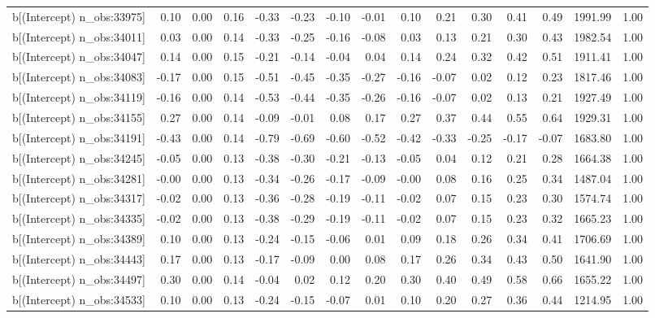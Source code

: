 \begin{table}[ht]
\begin{tabular}{rrrrrrrrrrrrrrr}
  b[(Intercept) n\_obs:33975] & 0.10 & 0.00 & 0.16 & -0.33 & -0.23 & -0.10 & -0.01 & 0.10 & 0.21 & 0.30 & 0.41 & 0.49 & 1991.99 & 1.00 \\ 
  b[(Intercept) n\_obs:34011] & 0.03 & 0.00 & 0.14 & -0.33 & -0.25 & -0.16 & -0.08 & 0.03 & 0.13 & 0.21 & 0.30 & 0.43 & 1982.54 & 1.00 \\ 
  b[(Intercept) n\_obs:34047] & 0.14 & 0.00 & 0.15 & -0.21 & -0.14 & -0.04 & 0.04 & 0.14 & 0.24 & 0.32 & 0.42 & 0.51 & 1911.41 & 1.00 \\ 
  b[(Intercept) n\_obs:34083] & -0.17 & 0.00 & 0.15 & -0.51 & -0.45 & -0.35 & -0.27 & -0.16 & -0.07 & 0.02 & 0.12 & 0.23 & 1817.46 & 1.00 \\ 
  b[(Intercept) n\_obs:34119] & -0.16 & 0.00 & 0.14 & -0.53 & -0.44 & -0.35 & -0.26 & -0.16 & -0.07 & 0.02 & 0.13 & 0.21 & 1927.49 & 1.00 \\ 
  b[(Intercept) n\_obs:34155] & 0.27 & 0.00 & 0.14 & -0.09 & -0.01 & 0.08 & 0.17 & 0.27 & 0.37 & 0.44 & 0.55 & 0.64 & 1929.31 & 1.00 \\ 
  b[(Intercept) n\_obs:34191] & -0.43 & 0.00 & 0.14 & -0.79 & -0.69 & -0.60 & -0.52 & -0.42 & -0.33 & -0.25 & -0.17 & -0.07 & 1683.80 & 1.00 \\ 
  b[(Intercept) n\_obs:34245] & -0.05 & 0.00 & 0.13 & -0.38 & -0.30 & -0.21 & -0.13 & -0.05 & 0.04 & 0.12 & 0.21 & 0.28 & 1664.38 & 1.00 \\ 
  b[(Intercept) n\_obs:34281] & -0.00 & 0.00 & 0.13 & -0.34 & -0.26 & -0.17 & -0.09 & -0.00 & 0.08 & 0.16 & 0.25 & 0.34 & 1487.04 & 1.00 \\ 
  b[(Intercept) n\_obs:34317] & -0.02 & 0.00 & 0.13 & -0.36 & -0.28 & -0.19 & -0.11 & -0.02 & 0.07 & 0.15 & 0.23 & 0.30 & 1574.74 & 1.00 \\ 
  b[(Intercept) n\_obs:34335] & -0.02 & 0.00 & 0.13 & -0.38 & -0.29 & -0.19 & -0.11 & -0.02 & 0.07 & 0.15 & 0.23 & 0.32 & 1665.23 & 1.00 \\ 
  b[(Intercept) n\_obs:34389] & 0.10 & 0.00 & 0.13 & -0.24 & -0.15 & -0.06 & 0.01 & 0.09 & 0.18 & 0.26 & 0.34 & 0.41 & 1706.69 & 1.00 \\ 
  b[(Intercept) n\_obs:34443] & 0.17 & 0.00 & 0.13 & -0.17 & -0.09 & 0.00 & 0.08 & 0.17 & 0.26 & 0.34 & 0.43 & 0.50 & 1641.90 & 1.00 \\ 
  b[(Intercept) n\_obs:34497] & 0.30 & 0.00 & 0.14 & -0.04 & 0.02 & 0.12 & 0.20 & 0.30 & 0.40 & 0.49 & 0.58 & 0.66 & 1655.22 & 1.00 \\ 
  b[(Intercept) n\_obs:34533] & 0.10 & 0.00 & 0.13 & -0.24 & -0.15 & -0.07 & 0.01 & 0.10 & 0.20 & 0.27 & 0.36 & 0.44 & 1214.95 & 1.00 \\ 

\end{tabular}
\end{table}

